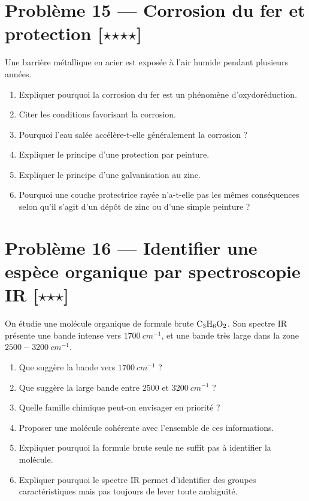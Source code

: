 \documentclass[11pt,a4paper]{article}
\newcommand{\etoile}{\ensuremath{\star}}
\begin{document}
\section*{Problème 15 --- Corrosion du fer et protection \hfill [\etoile\etoile\etoile\etoile]}

Une barrière métallique en acier est exposée à l'air humide pendant plusieurs années.

\begin{enumerate}[label=\arabic*)]
    \item Expliquer pourquoi la corrosion du fer est un phénomène d'oxydoréduction.
    \item Citer les conditions favorisant la corrosion.
    \item Pourquoi l'eau salée accélère-t-elle généralement la corrosion ?
    \item Expliquer le principe d'une protection par peinture.
    \item Expliquer le principe d'une galvanisation au zinc.
    \item Pourquoi une couche protectrice rayée n'a-t-elle pas les mêmes conséquences selon qu'il s'agit d'un dépôt de zinc ou d'une simple peinture ?
\end{enumerate}

\section*{Problème 16 --- Identifier une espèce organique par spectroscopie IR \hfill [\etoile\etoile\etoile]}

On étudie une molécule organique de formule brute $\ce{C3H6O2}$. Son spectre IR présente une bande intense vers $\SI{1700}{cm^{-1}}$, et une bande très large dans la zone $2500-3200\ \si{cm^{-1}}$.

\begin{enumerate}[label=\arabic*)]
    \item Que suggère la bande vers $\SI{1700}{cm^{-1}}$ ?
    \item Que suggère la large bande entre $2500$ et $3200\ \si{cm^{-1}}$ ?
    \item Quelle famille chimique peut-on envisager en priorité ?
    \item Proposer une molécule cohérente avec l'ensemble de ces informations.
    \item Expliquer pourquoi la formule brute seule ne suffit pas à identifier la molécule.
    \item Expliquer pourquoi le spectre IR permet d'identifier des groupes caractéristiques mais pas toujours de lever toute ambiguïté.
\end{enumerate}
\end{document}
